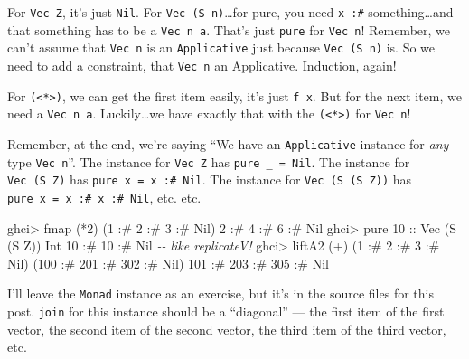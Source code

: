 \documentclass[]{article}
\newenvironment{Shaded}{}{}
\newcommand{\CommentTok}[1]{\textcolor[rgb]{0.38,0.63,0.69}{\textit{#1}}}
\newcommand{\DataTypeTok}[1]{\textcolor[rgb]{0.56,0.13,0.00}{#1}}
\newcommand{\DecValTok}[1]{\textcolor[rgb]{0.25,0.63,0.44}{#1}}
\newcommand{\FunctionTok}[1]{\textcolor[rgb]{0.02,0.16,0.49}{#1}}
\newcommand{\NormalTok}[1]{#1}
\newcommand{\OperatorTok}[1]{\textcolor[rgb]{0.40,0.40,0.40}{#1}}
\newcommand{\OtherTok}[1]{\textcolor[rgb]{0.00,0.44,0.13}{#1}}
\begin{document}
For \texttt{Vec\ Z}, it's just \texttt{Nil}. For \texttt{Vec\ (S\ n)}\ldots for
pure, you need \texttt{x\ :\#} something\ldots and that something has to be a
\texttt{Vec\ n\ a}. That's just \texttt{pure} for \texttt{Vec\ n}! Remember, we
can't assume that \texttt{Vec\ n} is an \texttt{Applicative} just because
\texttt{Vec\ (S\ n)} is. So we need to add a constraint, that \texttt{Vec\ n} an
Applicative. Induction, again!

For \texttt{(\textless{}*\textgreater{})}, we can get the first item easily,
it's just \texttt{f\ x}. But for the next item, we need a \texttt{Vec\ n\ a}.
Luckily\ldots we have exactly that with the
\texttt{(\textless{}*\textgreater{})} for \texttt{Vec\ n}!

Remember, at the end, we're saying ``We have an \texttt{Applicative} instance
for \emph{any} type \texttt{Vec\ n}''. The instance for \texttt{Vec\ Z} has
\texttt{pure\ \_\ =\ Nil}. The instance for \texttt{Vec\ (S\ Z)} has
\texttt{pure\ x\ =\ x\ :\#\ Nil}. The instance for \texttt{Vec\ (S\ (S\ Z))} has
\texttt{pure\ x\ =\ x\ :\#\ x\ :\#\ Nil}, etc. etc.

\begin{Shaded}
\begin{Highlighting}[]
\NormalTok{ghci}\OperatorTok{>} \FunctionTok{fmap}\NormalTok{ (}\OperatorTok{*}\DecValTok{2}\NormalTok{) (}\DecValTok{1} \OperatorTok{:\#} \DecValTok{2} \OperatorTok{:\#} \DecValTok{3} \OperatorTok{:\#} \DataTypeTok{Nil}\NormalTok{)}
\DecValTok{2} \OperatorTok{:\#} \DecValTok{4} \OperatorTok{:\#} \DecValTok{6} \OperatorTok{:\#} \DataTypeTok{Nil}
\NormalTok{ghci}\OperatorTok{>} \FunctionTok{pure} \DecValTok{10}\OtherTok{ ::} \DataTypeTok{Vec}\NormalTok{ (}\DataTypeTok{S}\NormalTok{ (}\DataTypeTok{S} \DataTypeTok{Z}\NormalTok{)) }\DataTypeTok{Int}
\DecValTok{10} \OperatorTok{:\#} \DecValTok{10} \OperatorTok{:\#} \DataTypeTok{Nil}         \CommentTok{{-}{-} like replicateV!}
\NormalTok{ghci}\OperatorTok{>}\NormalTok{ liftA2 (}\OperatorTok{+}\NormalTok{) (}\DecValTok{1} \OperatorTok{:\#} \DecValTok{2} \OperatorTok{:\#} \DecValTok{3} \OperatorTok{:\#} \DataTypeTok{Nil}\NormalTok{) (}\DecValTok{100} \OperatorTok{:\#} \DecValTok{201} \OperatorTok{:\#} \DecValTok{302} \OperatorTok{:\#} \DataTypeTok{Nil}\NormalTok{)}
\DecValTok{101} \OperatorTok{:\#} \DecValTok{203} \OperatorTok{:\#} \DecValTok{305} \OperatorTok{:\#} \DataTypeTok{Nil}
\end{Highlighting}
\end{Shaded}

I'll leave the \texttt{Monad} instance as an exercise, but it's in the source
files for this post. \texttt{join} for this instance should be a ``diagonal''
--- the first item of the first vector, the second item of the second vector,
the third item of the third vector, etc.
\end{document}
